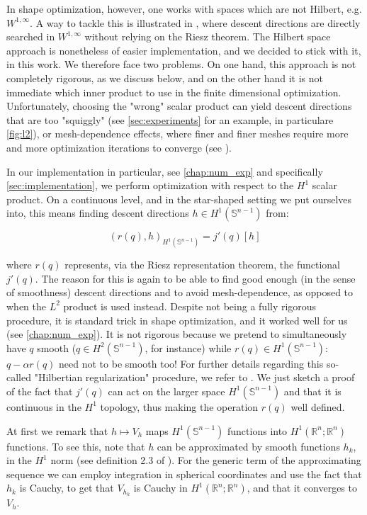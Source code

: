 \documentclass[english,a4paper,9pt,oneside]{scrbook}	%
\theoremstyle{break}
\theoremstyle{remark}
\newcommand{\mR}{\mathbb{R}}
\newcommand{\mS}{\mathbb{S}^{n-1}}
\begin{document}
In shape optimization, however, one works with spaces which are not Hilbert, e.g. $W^{1,\infty}$. A way to tackle this is illustrated in \cite{deckelnick}, where descent directions are directly searched in $W^{1,\infty}$ without relying on the Riesz theorem. The Hilbert space approach is nonetheless of easier implementation, and we decided to stick with it, in this work. We therefore face two problems. On one hand, this approach is not completely rigorous, as we discuss below, and on the other hand it is not immediate which inner product to use in the finite dimensional optimization. Unfortunately, choosing the "wrong" scalar product can yield descent directions that are too "squiggly" (see \cref{sec:experiments} for an example, in particulare \cref{fig:l2}), or mesh-dependence effects, where finer and finer meshes require more and more optimization iterations to converge (see \cite{mesh_dependence}).

In our implementation in particular, see \cref{chap:num_exp} and specifically \cref{sec:implementation}, we perform optimization with respect to the $H^1$ scalar product. On a continuous level, and in the star-shaped setting we put ourselves into, this means finding descent directions $h \in H^1(\mS)$ from:

$$(r(q),h)_{H^1(\mS)}  = j'(q)[h]$$

where $r(q)$ represents, via the Riesz representation theorem, the functional $j'(q)$. The reason for this is again to be able to find good enough (in the sense of smoothness) descent directions and to avoid mesh-dependence, as opposed to when the $L^2$ product is used instead. Despite not being a fully rigorous procedure, it is standard trick in shape optimization, and it worked well for us (see  \cref{chap:num_exp}). It is not rigorous because we pretend to simultaneously have $q$ smooth ($q \in H^2(\mS)$, for instance) while $r(q) \in H^1(\mS)$: $q-\alpha r(q)$ need not to be smooth too!
For further details regarding this so-called "Hilbertian regularization" procedure, we refer to \cite{allaire}. We just sketch a proof of the fact that $j'(q)$ can act on the larger space $H^1(\mS)$ and that it is continuous in the $H^1$ topology, thus making the operation $r(q)$ well defined.

At first we remark that $h\mapsto V_h$ maps $H^1(\mS)$ functions into $H^1(\mR^n;\mR^n)$ functions. To see this, note that $h$ can be approximated by smooth functions $h_k$, in the $H^1$ norm (see definition 2.3 of \cite{aubin}). For the generic term of the approximating sequence we can employ integration in spherical coordinates and use the fact that $h_k$ is Cauchy, to get that $V_{h_k}$ is Cauchy in $H^1(\mR^n;\mR^n)$, and that it converges to $V_h$. 
\end{document}
